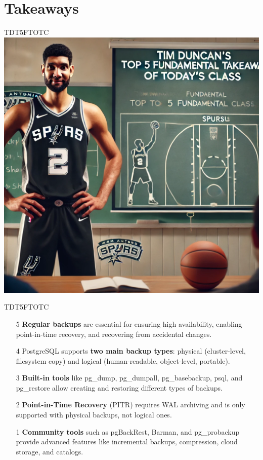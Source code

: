\documentclass[aspectratio=169]{beamer}
\begin{document}
\section*{Takeaways}

\begin{frame}{TDT5FTOTC}
    \centering
    \includegraphics[height=0.9\textheight]{figures/tim.png}
\end{frame}

\begin{frame}{TDT5FTOTC}
    \pause
    \begin{itemize}
        \item[5] \textbf{Regular backups} are essential for ensuring high availability, enabling point-in-time recovery, and recovering from accidental changes. \pause

        \item[4] PostgreSQL supports \textbf{two main backup types}: physical (cluster-level, filesystem copy) and logical (human-readable, object-level, portable). \pause

        \item[3] \textbf{Built-in tools} like pg\_dump, pg\_dumpall, pg\_basebackup, psql, and pg\_restore allow creating and restoring different types of backups. \pause

        \item[2] \textbf{Point-in-Time Recovery} (PITR) requires WAL archiving and is only supported with physical backups, not logical ones. \pause

        \item[1] \textbf{Community tools} such as pgBackRest, Barman, and pg\_probackup provide advanced features like incremental backups, compression, cloud storage, and catalogs.
    \end{itemize}
\end{frame}
\end{document}
